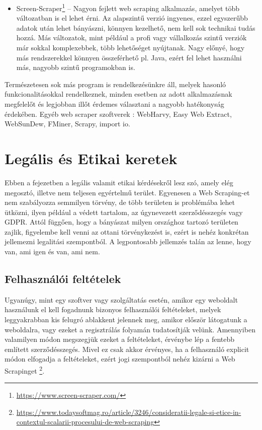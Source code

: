 \begin{itemize}
\item Screen-Scraper\footnote{\url{https://www.screen-scraper.com/}} – Nagyon fejlett web scraping alkalmazás, amelyet több változatban is el lehet érni. Az alapszintű verzió ingyenes, ezzel egyszerűbb adatok után lehet bányászni, könnyen kezelhető, nem kell sok technikai tudás hozzá. Más változatok, mint például a profi vagy vállalkozás szintű verziók már sokkal komplexebbek, több lehetőséget nyújtanak. Nagy előnyé, hogy más rendszerekkel könnyen összeférhető pl. Java, ezért fel lehet használni más, nagyobb szintű programokban is.
\end{itemize}

Természetesen sok más program is rendelkezésünkre áll, melyek hasonló funkcionalitásokkal rendelkeznek, minden esetben az adott alkalmazásnak megfelelőt és legjobban illőt érdemes választani a nagyobb hatékonyság érdekében. Egyéb web scraper szoftverek \cite{sirisuriya2015comparative}: WebHarvy, Easy Web Extract, WebSunDew, FMiner, Scrapy, import io. 

\section{Legális és Etikai keretek}

Ebben a fejezetben a legális valamit etikai kérdésekről lesz szó, amely elég megosztó, illetve nem teljesen egyértelmű terület. Egyenesen a Web Scraping-et nem szabályozza semmilyen törvény, de több területen is problémába lehet ütközni, ilyen például a védett tartalom, az úgynevezett szerződésszegés vagy GDPR. Attól függően, hogy a bányászat milyen országhoz tartozó területen zajlik, figyelembe kell venni az ottani törvénykezést is, ezért is nehéz konkrétan jellemezni legalitási szempontból. A legpontosabb jellemzés talán az lenne, hogy van, ami igen és van, ami nem.

\subsection{Felhasználói feltételek}

Ugyanúgy, mint egy szoftver vagy szolgáltatás esetén, amikor egy weboldalt használunk el kell fogadnunk bizonyos felhasználói feltételeket, melyek leggyakrabban kis felugró ablakkent jelennek meg, amikor először látogatunk a weboldalra, vagy ezeket a regisztrálás folyamán tudatosítják velünk. Amennyiben valamilyen módon megszegjük ezeket a feltételeket, érvénybe lép a fentebb említett szerződésszegés. Mivel ez csak akkor érvényes, ha a felhasználó explicit módon elfogadja a feltételeket, ezért jogi szempontból nehéz kizárni a Web Scrapinget \footnote{\url{https://www.todaysoftmag.ro/article/3246/consideratii-legale-si-etice-in-contextul-scalarii-procesului-de-web-scraping}}. 

